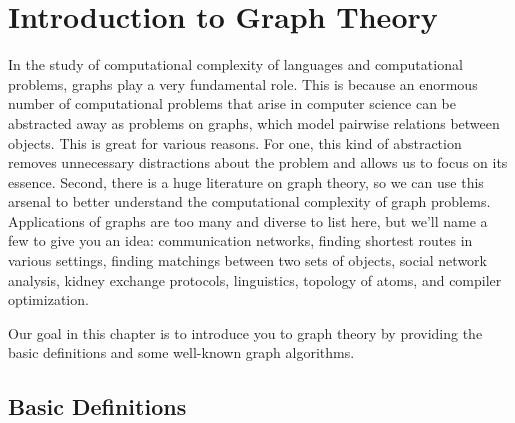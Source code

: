 

\chapter{Introduction to Graph Theory}
\label{chapter:intro-to-graph-theory}

\begin{preamble}
In the study of computational complexity of languages and computational problems, graphs play a very fundamental role. This is because an enormous number of computational problems that arise in computer science can be abstracted away as problems on graphs, which model pairwise relations between objects. This is great for various reasons. For one, this kind of abstraction removes unnecessary distractions about the problem and allows us to focus on its essence. Second, there is a huge literature on graph theory, so we can use this arsenal to better understand the computational complexity of graph problems. Applications of graphs are too many and diverse to list here, but we'll name a few to give you an idea: communication networks, finding shortest routes in various settings, finding matchings between two sets of objects, social network analysis, kidney exchange protocols, linguistics, topology of atoms, and compiler optimization.

Our goal in this chapter is to introduce you to graph theory by providing the basic definitions and some well-known graph algorithms.
\end{preamble}



\section{Basic Definitions}



